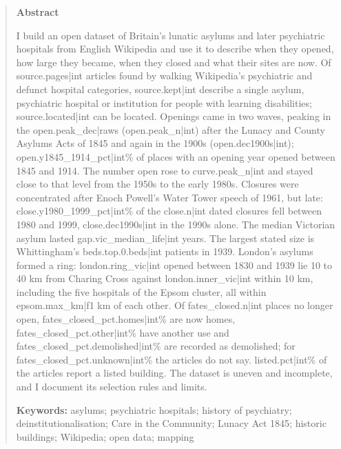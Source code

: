 \documentclass[11pt,a4paper]{article}
\begin{document}
\begin{quote}
\small
\begin{center}\textbf{Abstract}\end{center}
I build an open dataset of Britain's lunatic asylums and later psychiatric hospitals from English Wikipedia and use it to describe when they opened, how large they became, when they closed and what their sites are now. Of {{source.pages|int}} articles found by walking Wikipedia's psychiatric and defunct hospital categories, {{source.kept|int}} describe a single asylum, psychiatric hospital or institution for people with learning disabilities; {{source.located|int}} can be located. Openings came in two waves, peaking in the {{open.peak_dec|raw}}s ({{open.peak_n|int}}) after the Lunacy and County Asylums Acts of 1845 and again in the 1900s ({{open.dec1900s|int}}); {{open.y1845_1914_pct|int}}\% of places with an opening year opened between 1845 and 1914. The number open rose to {{curve.peak_n|int}} and stayed close to that level from the 1950s to the early 1980s. Closures were concentrated after Enoch Powell's Water Tower speech of 1961, but late: {{close.y1980_1999_pct|int}}\% of the {{close.n|int}} dated closures fell between 1980 and 1999, {{close.dec1990s|int}} in the 1990s alone. The median Victorian asylum lasted {{gap.vic_median_life|int}} years. The largest stated size is Whittingham's {{beds.top.0.beds|int}} patients in 1939. London's asylums formed a ring: {{london.ring_vic|int}} opened between 1830 and 1939 lie 10 to 40 km from Charing Cross against {{london.inner_vic|int}} within 10 km, including the five hospitals of the Epsom cluster, all within {{epsom.max_km|f1}} km of each other. Of {{fates_closed.n|int}} places no longer open, {{fates_closed_pct.homes|int}}\% are now homes, {{fates_closed_pct.other|int}}\% have another use and {{fates_closed_pct.demolished|int}}\% are recorded as demolished; for {{fates_closed_pct.unknown|int}}\% the articles do not say. {{listed.pct|int}}\% of the articles report a listed building. The dataset is uneven and incomplete, and I document its selection rules and limits.

\textbf{Keywords:} asylums; psychiatric hospitals; history of psychiatry; deinstitutionalisation; Care in the Community; Lunacy Act 1845; historic buildings; Wikipedia; open data; mapping
\end{quote}
\end{document}
